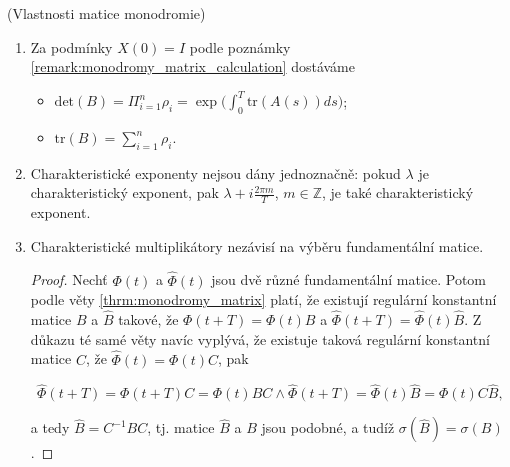 \begin{remark}\label{remark:monodromy_matrix_properties}
	(Vlastnosti matice monodromie)
	
	\begin{enumerate}
		\item Za podmínky $X(0) = I $ podle poznámky \ref{remark:monodromy_matrix_calculation} dostáváme 
		
		\begin{itemize}
			\item $\mathrm{det}(B) = \Pi_{i = 1}^{n} \rho_{i} = \exp \Big( \int_{0}^{T} \mathrm{tr} (A(s)) ds \Big)$;
			
			\item $\mathrm{tr}(B) = \sum_{i = 1}^{n} \rho_{i}$.
		\end{itemize}
		
		\item Charakteristické exponenty nejsou dány jednoznačně: pokud $\lambda$ je charakteristický exponent, pak $\lambda + i \tfrac{2 \pi m}{T}$, $m \in \mathbb{Z}$, je také charakteristický exponent.
		
		\item Charakteristické multiplikátory nezávisí na výběru fundamentální matice.
		
		\begin{proof}
			Nechť $\Phi(t)$ a $\hat{\Phi}(t)$ jsou dvě různé fundamentální matice. Potom podle věty \ref{thrm:monodromy_matrix} platí, že existují regulární konstantní matice $B$ a $\hat{B}$ takové, že $\Phi(t+T) = \Phi(t) B$ a $\hat{\Phi}(t+T) = \hat{\Phi}(t) \hat{B}$.  Z důkazu té samé věty navíc vyplývá, že existuje taková regulární konstantní matice $C$, že $\hat{\Phi}(t) = \Phi(t) C$, pak
			
			\begin{equation*}
				\hat{\Phi}(t+T) = \Phi(t+T) C = \Phi(t) B C 
				\wedge
				\hat{\Phi}(t+T) = \hat{\Phi}(t) \hat{B} = \Phi(t) C \hat{B},
			\end{equation*}
			
			\noindent
			a tedy $\hat{B}  = C^{-1} B C$, tj. matice $\hat{B}$ a $B$ jsou podobné, a tudíž $\sigma(\hat{B}) = \sigma(B)$.
		\end{proof}
	\end{enumerate}
\end{remark}

\medskip


